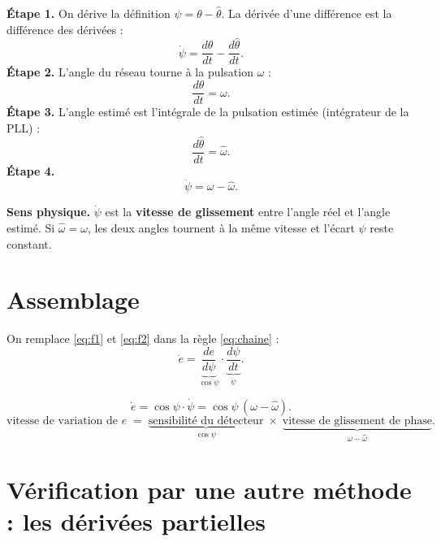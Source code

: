 \documentclass[11pt,a4paper]{article}
\numberwithin{equation}{section}
\newcommand{\hth}{\hat{\theta}}
\newcommand{\hw}{\hat{\omega}}
\begin{document}
\textbf{Étape 1.} On dérive la définition $\psi=\theta-\hth$. La dérivée d'une différence est la différence
des dérivées :
\begin{equation}
\dot\psi = \frac{d\theta}{dt}-\frac{d\hth}{dt}.
\end{equation}
\textbf{Étape 2.} L'angle du réseau tourne à la pulsation $\omega$ :
\begin{equation}
\frac{d\theta}{dt}=\omega .
\end{equation}
\textbf{Étape 3.} L'angle estimé est l'intégrale de la pulsation estimée (intégrateur de la PLL) :
\begin{equation}
\frac{d\hth}{dt}=\hw .
\end{equation}
\textbf{Étape 4.}
\begin{equation}\label{eq:f2}
\boxed{\dot\psi = \omega-\hw .}
\end{equation}

\textbf{Sens physique.} $\dot\psi$ est la \textbf{vitesse de glissement} entre l'angle réel et l'angle estimé.
Si $\hw=\omega$, les deux angles tournent à la même vitesse et l'écart $\psi$ reste constant.

\section{Assemblage}

On remplace \eqref{eq:f1} et \eqref{eq:f2} dans la règle \eqref{eq:chaine} :
\begin{equation}
\dot e = \underbrace{\frac{de}{d\psi}}_{\cos\psi}\cdot\underbrace{\frac{d\psi}{dt}}_{\dot\psi}.
\end{equation}

\begin{resultat}
\begin{equation}
\dot e = \cos\psi\cdot\dot\psi = \cos\psi\,(\omega-\hw).
\end{equation}
\[
\text{vitesse de variation de } e \;=\; \underbrace{\text{sensibilité du détecteur}}_{\cos\psi}\;\times\;\underbrace{\text{vitesse de glissement de phase}}_{\omega-\hw}.
\]
\end{resultat}

\section{Vérification par une autre méthode : les dérivées partielles}
\end{document}
